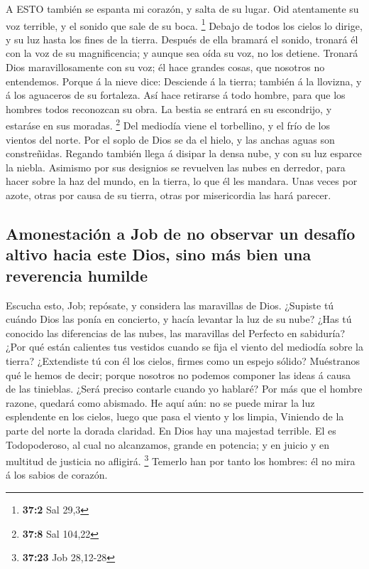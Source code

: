  A ESTO también se espanta mi corazón, y salta de su lugar.
 Oid atentamente su voz terrible, y el sonido que sale de su
boca. \footnote{\textbf{37:2} Sal 29,3}  Debajo de todos los
cielos lo dirige, y su luz hasta los fines de la tierra. 
Después de ella bramará el sonido, tronará él con la voz de su
magnificencia; y aunque sea oída su voz, no los detiene. 
Tronará Dios maravillosamente con su voz; él hace grandes cosas, que
nosotros no entendemos.  Porque á la nieve dice: Desciende á
la tierra; también á la llovizna, y á los aguaceros de su fortaleza.
 Así hace retirarse á todo hombre, para que los hombres
todos reconozcan su obra.  La bestia se entrará en su
escondrijo, y estaráse en sus moradas. \footnote{\textbf{37:8} Sal
  104,22}  Del mediodía viene el torbellino, y el frío de
los vientos del norte.  Por el soplo de Dios se da el
hielo, y las anchas aguas son constreñidas.  Regando
también llega á disipar la densa nube, y con su luz esparce la niebla.
 Asimismo por sus designios se revuelven las nubes en
derredor, para hacer sobre la haz del mundo, en la tierra, lo que él les
mandara.  Unas veces por azote, otras por causa de su
tierra, otras por misericordia las hará parecer.

\hypertarget{amonestaciuxf3n-a-job-de-no-observar-un-desafuxedo-altivo-hacia-este-dios-sino-muxe1s-bien-una-reverencia-humilde}{%
\subsection{Amonestación a Job de no observar un desafío altivo hacia
este Dios, sino más bien una reverencia
humilde}\label{amonestaciuxf3n-a-job-de-no-observar-un-desafuxedo-altivo-hacia-este-dios-sino-muxe1s-bien-una-reverencia-humilde}}

 Escucha esto, Job; repósate, y considera las maravillas de
Dios.  ¿Supiste tú cuándo Dios las ponía en concierto, y
hacía levantar la luz de su nube?  ¿Has tú conocido las
diferencias de las nubes, las maravillas del Perfecto en sabiduría?
 ¿Por qué están calientes tus vestidos cuando se fija el
viento del mediodía sobre la tierra?  ¿Extendiste tú con él
los cielos, firmes como un espejo sólido?  Muéstranos qué
le hemos de decir; porque nosotros no podemos componer las ideas á causa
de las tinieblas.  ¿Será preciso contarle cuando yo
hablaré? Por más que el hombre razone, quedará como abismado.
 He aquí aún: no se puede mirar la luz esplendente en los
cielos, luego que pasa el viento y los limpia,  Viniendo de
la parte del norte la dorada claridad. En Dios hay una majestad
terrible.  El es Todopoderoso, al cual no alcanzamos,
grande en potencia; y en juicio y en multitud de justicia no afligirá.
\footnote{\textbf{37:23} Job 28,12-28}  Temerlo han por
tanto los hombres: él no mira á los sabios de corazón.

